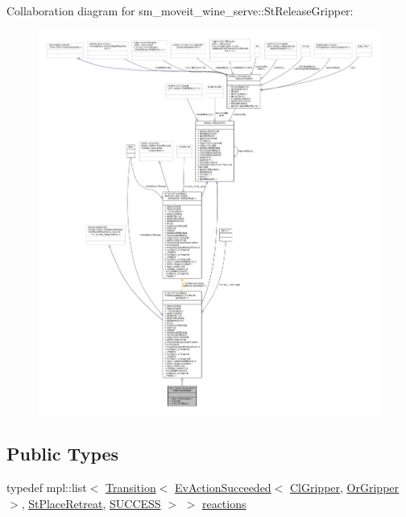 Collaboration diagram for sm\+\_\+moveit\+\_\+wine\+\_\+serve\+:\+:St\+Release\+Gripper\+:
\nopagebreak
\begin{figure}[H]
\begin{center}
\leavevmode
\includegraphics[width=350pt]{structsm__moveit__wine__serve_1_1StReleaseGripper__coll__graph}
\end{center}
\end{figure}
\subsection*{Public Types}
\begin{DoxyCompactItemize}
\item 
typedef mpl\+::list$<$ \hyperlink{classsmacc_1_1Transition}{Transition}$<$ \hyperlink{structsmacc_1_1default__events_1_1EvActionSucceeded}{Ev\+Action\+Succeeded}$<$ \hyperlink{classsm__moveit__wine__serve_1_1cl__gripper_1_1ClGripper}{Cl\+Gripper}, \hyperlink{classsm__moveit__wine__serve_1_1OrGripper}{Or\+Gripper} $>$, \hyperlink{structsm__moveit__wine__serve_1_1StPlaceRetreat}{St\+Place\+Retreat}, \hyperlink{structsmacc_1_1default__transition__tags_1_1SUCCESS}{S\+U\+C\+C\+E\+SS} $>$ $>$ \hyperlink{structsm__moveit__wine__serve_1_1StReleaseGripper_a1507f23cfddea7bb85865c7f1027ac7b}{reactions}
\end{DoxyCompactItemize}
